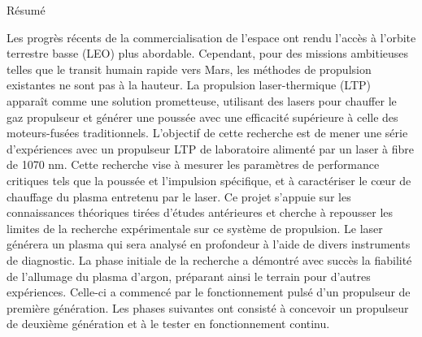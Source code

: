 
\begin{plainchp}{Résumé}

    Les progrès récents de la commercialisation de l'espace ont rendu l'accès à l'orbite terrestre basse (LEO) plus abordable. Cependant, pour des missions ambitieuses telles que le transit humain rapide vers Mars, les méthodes de propulsion existantes ne sont pas à la hauteur. La propulsion laser-thermique (LTP) apparaît comme une solution prometteuse, utilisant des lasers pour chauffer le gaz propulseur et générer une poussée avec une efficacité supérieure à celle des moteurs-fusées traditionnels. L'objectif de cette recherche est de mener une série d'expériences avec un propulseur LTP de laboratoire alimenté par un laser à fibre de 1070 nm. Cette recherche vise à mesurer les paramètres de performance critiques tels que la poussée et l'impulsion spécifique, et à caractériser le cœur de chauffage du plasma entretenu par le laser. Ce projet s'appuie sur les connaissances théoriques tirées d'études antérieures et cherche à repousser les limites de la recherche expérimentale sur ce système de propulsion. Le laser générera un plasma qui sera analysé en profondeur à l'aide de divers instruments de diagnostic. La phase initiale de la recherche a démontré avec succès la fiabilité de l'allumage du plasma d'argon, préparant ainsi le terrain pour d'autres expériences. Celle-ci a commencé par le fonctionnement pulsé d'un propulseur de première génération. Les phases suivantes ont consisté à concevoir un propulseur de deuxième génération et à le tester en fonctionnement continu.
    
\end{plainchp}